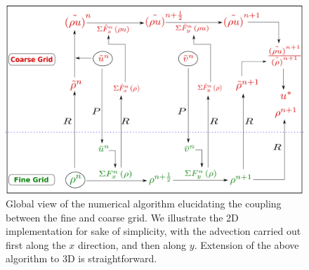 
\begin{figure}[ht]
    \centering
    \includegraphics[width = \textwidth]{plots/momcons_sagar.png}
    \caption{Global view of the numerical algorithm elucidating the coupling between the fine and coarse grid. We illustrate the 2D implementation for sake of simplicity, with the advection carried out first along the $x$ direction, and then along $y$. Extension of the above algorithm to 3D is straightforward.}
    \label{momcons_sagar}
\end{figure}



